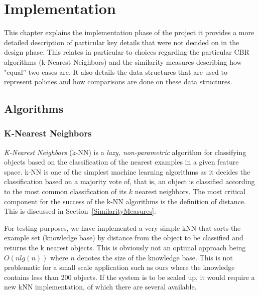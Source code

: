  
 

\chapter{Implementation}\label{impl}

\minitoc


This chapter explains the implementation phase of the project it provides a more detailed description of particular key
details that were not decided on in the design phase. This relates in particular to choices regarding the particular CBR algorithms
(k-Nearest Neighbors) and the similarity measures describing how "equal'' two cases are. It also details the data structures that
are used to represent policies and how comparisons are done on these data structures.

\section{Algorithms}

\subsection{K-Nearest Neighbors}\label{kNN}

\emph{K-Nearest Neighbors} (k-NN) is a \emph{lazy, non-parametric} algorithm for classifying objects based on the classification of the nearest examples in a given feature space. k-NN is one of the simplest machine learning algorithms as it decides the classification based on a majority vote of, that is, an object is classified according to the most common classification of its $k$ nearest neighbors. The most critical component for the success of the k-NN algorithms is the definition of distance. This is discussed in Section~\ref{SimilarityMeasures}. 

For testing purposes, we have implemented a very simple kNN that sorts the example set (knowledge base) by distance from the object to be classified and returns the k nearest objects. This is obviously not an optimal approach being $O(n lg(n))$ where $n$ denotes the size of the knowledge base. This is not problematic for a small scale application such as ours where the knowledge contains less than 200 objects. If the system is to be scaled up, it would require a new kNN implementation, of which there are several available.


